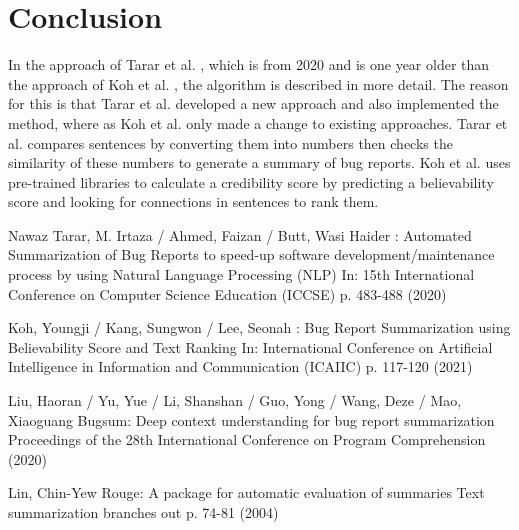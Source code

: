 \documentclass[a4paper,10pt, bibliography=totocnumbered]{scrreprt}
\begin{document}
\chapter{Conclusion}
\label{conclusion}
In the approach of Tarar et al. \cite{tarar}, which is from 2020 and is one year older than the approach of Koh et al. \cite{koh}, the algorithm is described in more detail. The reason for this is that Tarar et al. \cite{tarar} developed a new approach and also implemented the method, where as Koh et al. \cite{koh} only made a change to existing approaches. Tarar et al. \cite{tarar} compares sentences by converting them into numbers then checks the similarity of these numbers to generate a summary of bug reports. Koh et al. \cite{koh} uses pre-trained libraries to calculate a credibility score by predicting a believability score and looking for connections in sentences to rank them.



\begin{thebibliography}{9}

 Nawaz Tarar, M. Irtaza / Ahmed, Faizan / Butt, Wasi Haider : Automated Summarization of Bug Reports to speed-up software development/maintenance process by using Natural Language Processing (NLP) In: 15th International Conference on Computer Science Education (ICCSE) p. 483-488 (2020)

Koh, Youngji / Kang, Sungwon / Lee, Seonah : 
Bug Report Summarization using Believability Score and Text Ranking
In: International Conference on Artificial Intelligence in Information and Communication (ICAIIC) p. 117-120 (2021)

 Liu, Haoran / Yu, Yue / Li, Shanshan / Guo, Yong / Wang, Deze / Mao, Xiaoguang 
Bugsum: Deep context understanding for bug report summarization  
Proceedings of the 28th International Conference on Program Comprehension (2020)

Lin, Chin-Yew 
Rouge: A package for automatic evaluation of summaries  
Text summarization branches out p. 74-81 (2004)


\end{thebibliography}

\listoffigures

\listoftables
\end{document}
